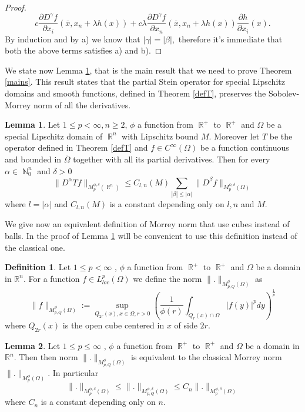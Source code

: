 \documentclass[12pt]{article}
\theoremstyle{definition}
\newtheorem{definition}{Definition}
\newtheorem{lemma}{Lemma}
\DeclareMathOperator\rr{\mathbb{R}}
\DeclareMathOperator\nn{\mathbb{N}}
\begin{document}
\begin{proof}
\[ c \frac{\partial D^{\gamma} f}{\partial x_i} (\overline x, x_n+\lambda h(x)) + c\lambda \frac{\partial D^{\gamma} f}{\partial x_n} (\overline x, x_n+\lambda h(x)) \frac{\partial h}{\partial x_i}(x). \]
By induction and by a) we know that $|\gamma|=|\beta|,$ therefore it's immediate that both the above terms satisfies a) and b).


\end{proof}

We state now Lemma \ref{Tlemma}, that is the main result that we need to prove Theorem \ref{mains}. This result states that the partial Stein operator for special Lipschitz domains and smooth functions, defined in Theorem \ref{defT}, preserves the Sobolev-Morrey norm of all the derivatives.

\begin{lemma}\label{Tlemma}
Let $1\le p<\infty,n\ge2$, $\phi$ a function from $\rr^+$ to $\rr^+$ and $\Omega$ be a special Lipschitz domain of $\rr^n$ with Lipschitz bound $M.$ Moreover let $T$ be the operator defined in Theorem \ref{defT} and $f \in C^\infty( \Omega)$ be a function continuous and bounded in $\overline \Omega$ together with all its partial derivatives. Then  for every $\alpha \in \nn_0^n$ and $\delta>0$
\begin{equation}
 \| D^\alpha Tf\|_{M_p^{\phi,\delta}(\rr^n)}\le C_{l,n}(M)\sum_{|\beta|\le |\alpha|}\|D^\beta f \|_{M_p^{\phi,\delta}(\Omega)} \label{Tbound2}
 \end{equation}
where $l=|\alpha|$ and $C_{l,n}(M)$ is a constant depending only on $l,n$ and $M.$
\end{lemma}
We give now an equivalent definition of Morrey norm that use cubes instead of balls. In the proof of Lemma \ref{Tlemma} will be convenient to use this definition instead of the classical one.




\begin{definition}
Let $1\le p< \infty$ , $\phi$ a function from $\rr^+$ to $\rr^+$ and $\Omega$ be a domain in $\mathbb{R}^n$. For a function $f \in L^p_{loc}(\Omega)$ we define the norm $\| .\|_{M_{p,Q}^\phi(\Omega)}$ as
\[ \|f\|_{M_{p,Q}^\phi(\Omega)}:=\sup_{Q_{2r}(x), x \in \Omega,r>0} \left(  \frac{1}{\phi(r)}\int_{Q_r(x)\cap \Omega} |f(y)|^p dy \right )^{\frac{1}{p}}\]
where $Q_{2r}(x)$ is the open cube centered in $x$ of side $2r$.
\end{definition}


\begin{lemma}\label{cubicmorrey}
Let $1\le p\le \infty$ , $\phi$ a function from $\rr^+$ to $\rr^+$ and $\Omega$ be a domain in $\mathbb{R}^n$. Then then norm $\| .\|_{M_{p,Q}^\phi(\Omega)}$ is equivalent to the classical Morrey norm $\|.\|_{M_{p}^\phi(\Omega)}$. In particular 
\[ \| .\|_{M_{p}^{\phi,\delta}(\Omega)} \le \| .\|_{M_{p,Q}^{\phi,\delta}(\Omega)}\le C_{n}\| .\|_{M_{p}^{\phi,\delta}(\Omega)}\]
where $C_n$ is a constant depending only on $n.$
\end{lemma}
\end{document}
